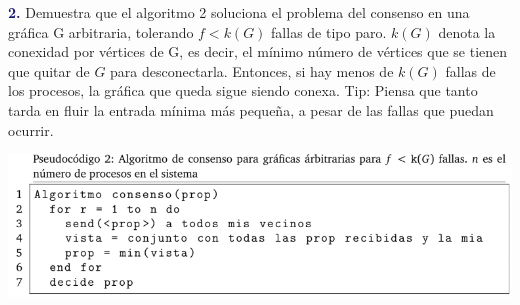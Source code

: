 \newpage
\textbf{\textcolor{MidnightBlue}{2.}}
Demuestra que el algoritmo 2 soluciona el problema del consenso en una gráfica G arbitraria, tolerando
$f < k(G)$ fallas de tipo paro. $k(G)$ denota la conexidad por vértices de G, es decir, el mínimo
número de vértices que se tienen que quitar de $G$ para desconectarla. Entonces, si hay menos de $k(G)$
fallas de los procesos, la gráfica que queda sigue siendo conexa. Tip: Piensa que tanto tarda en fluir la
entrada mínima más pequeña, a pesar de las fallas que puedan ocurrir.\\


\begin{center}
    \includegraphics[scale=0.6]{consensoProblema2.png}
    \end{center}
